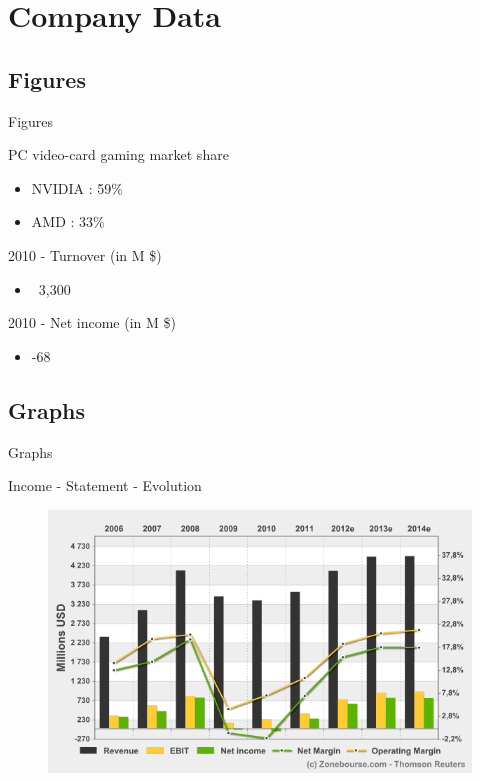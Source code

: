 \documentclass{beamer}
\begin{document}
\section{Company Data}
\subsection{Figures}
\begin{frame}{Figures}
	\transdissolve[duration=0.1] %
	\begin{block}{PC video-card gaming market share}
		\begin{itemize}
			\item<+->{NVIDIA : 59\% }
			\item<+->{AMD : 33\% }
		\end{itemize}
	\end{block}	
	\pause
	\begin{block}{2010 - Turnover (in M \$)}
		\begin{itemize}
			\item<+->{~3,300}
		\end{itemize}
	\end{block}
	\pause
	\begin{block}{2010 - Net income (in M \$)}
		\begin{itemize}
			\item<+->{-68}
		\end{itemize}
	\end{block}
\end{frame}

\subsection{Graphs}
\begin{frame}{Graphs}
	\begin{block}{Income - Statement - Evolution}
		\begin{figure}[h]
			\includegraphics[width=0.90\textheight]{images/Income_Statement_Evolution.png}
		\end{figure}
	\end{block}	
\end{frame}
\end{document}
